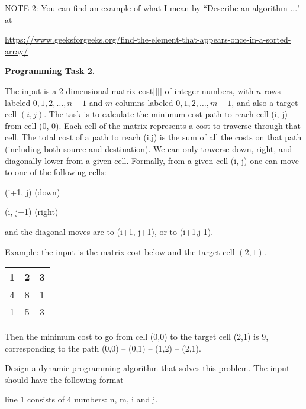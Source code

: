 \documentclass[11pt]{article}
\begin{document}
\begin{enumerate}
 
  
\bigskip


NOTE 2:  You can find an example of what I mean by  ``Describe an algorithm ..." at

\url{https://www.geeksforgeeks.org/find-the-element-that-appears-once-in-a-sorted-array/}


\newpage

\textbf{Programming Task 2.}


The input is a 2-dimensional  matrix cost[][] of integer numbers, with $n$ rows labeled $0,1, 2, \ldots, n-1$ and $m$ columns labeled $0,1,2,\ldots, m-1$, and also a target cell $(i,j)$. The task is to calculate the minimum cost path to reach cell (i, j) from cell (0, 0). Each cell of the matrix represents a cost to traverse through that cell. The total cost of a path to reach (i,j) is the sum of all the costs on that path (including both source and destination).
We can only traverse down, right,  and diagonally lower  from a given cell. Formally, from a given cell (i, j) one can move to one of the following cells: 

(i+1, j) (down)


(i, j+1) (right)



 and the diagonal moves are to (i+1, j+1), or to  (i+1,j-1).

\medskip

Example:  the input is the matrix cost below and the target cell $(2,1)$.
\medskip


\begin{tabular}{|c|c|c|}
\hline
1  & 2 & 3 \\
\hline
4 & 8 & 1 \\
\hline
1 & 5 & 3 \\
\hline

\end{tabular}
\medskip

Then the minimum cost to go from cell (0,0) to the target cell (2,1) is 9, corresponding to the path (0,0) -- (0,1) -- (1,2) -- (2,1).


Design a dynamic programming algorithm that solves this problem. The input should have the following format

line 1 consists of 4 numbers: n, m, i and j.


\end{enumerate}
\end{document}

